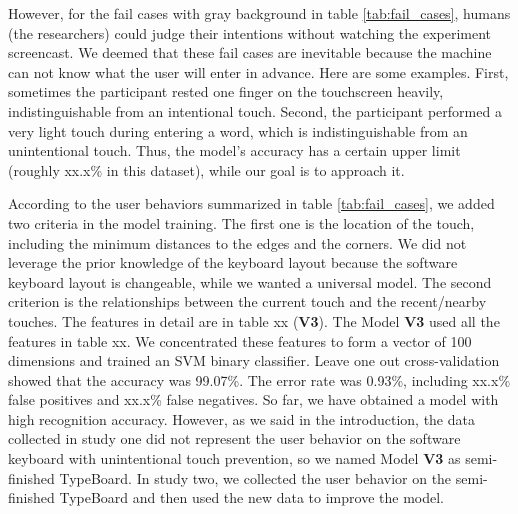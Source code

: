However, for the fail cases with gray background in table \ref{tab:fail_cases}, humans (the researchers) could judge their intentions without watching the experiment screencast. We deemed that these fail cases are inevitable because the machine can not know what the user will enter in advance. Here are some examples. First, sometimes the participant rested one finger on the touchscreen heavily, indistinguishable from an intentional touch. Second, the participant performed a very light touch during entering a word, which is indistinguishable from an unintentional touch. Thus, the model's accuracy has a certain upper limit (roughly xx.x\% in this dataset), while our goal is to approach it.


According to the user behaviors summarized in table \ref{tab:fail_cases}, we added two criteria in the model training. The first one is the location of the touch, including the minimum distances to the edges and the corners. We did not leverage the prior knowledge of the keyboard layout because the software keyboard layout is changeable, while we wanted a universal model. The second criterion is the relationships between the current touch and the recent/nearby touches. The features in detail are in table xx (\textbf{V3}). The Model \textbf{V3} used all the features in table xx. We concentrated these features to form a vector of 100 dimensions and trained an SVM binary classifier. Leave one out cross-validation showed that the accuracy was 99.07\%. The error rate was 0.93\%, including xx.x\% false positives and xx.x\% false negatives. So far, we have obtained a model with high recognition accuracy. However, as we said in the introduction, the data collected in study one did not represent the user behavior on the software keyboard with unintentional touch prevention, so we named Model \textbf{V3} as semi-finished TypeBoard. In study two, we collected the user behavior on the semi-finished TypeBoard and then used the new data to improve the model.


